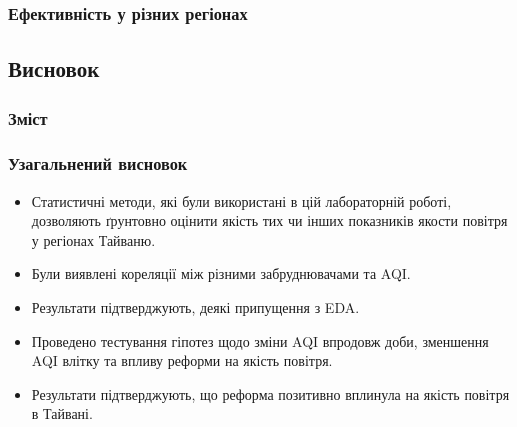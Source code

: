 \documentclass{beamer}
\begin{document}
\begin{frame}
  \frametitle{Ефективність у різних регіонах}

\end{frame}


\begin{frame}
  \section{Висновок}

  \frametitle{Зміст}
  \tableofcontents[currentsection]
\end{frame}

\begin{frame}
  \frametitle{Узагальнений висновок}
  \begin{itemize}
    \item Статистичні методи, які були використані в цій лабораторній роботі,
    дозволяють ґрунтовно оцінити якість тих чи інших показників якости повітря у регіонах Тайваню.
    
    \item Були виявлені кореляції між різними забруднювачами та AQI.
   
    \item Результати підтверджують, деякі припущення з EDA.
    
    \item Проведено тестування гіпотез щодо зміни AQI впродовж доби, 
    зменшення AQI влітку та впливу реформи на якість повітря.

    \item Результати підтверджують, що реформа позитивно вплинула на якість повітря в Тайвані.
  \end{itemize}
  
\end{frame}
\end{document}
